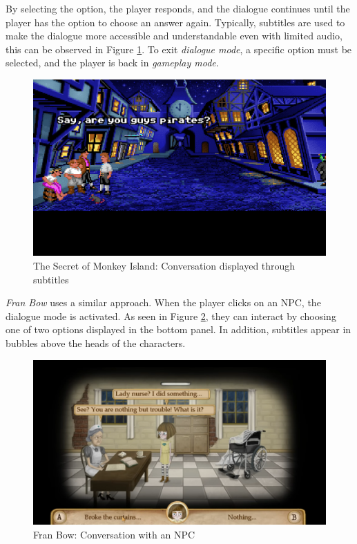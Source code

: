 By selecting the option, the player responds, and the dialogue continues until the player has the option to choose an answer again. Typically, subtitles are used to make the dialogue more accessible and understandable even with limited audio, this can be observed in Figure \ref{fig:D-TSoMI2}. To exit \textit{dialogue mode}, a specific option must be selected, and the player is back in \textit{gameplay mode}.

\begin{figure}[H]
\centering
\includegraphics[width=.8\linewidth]{img/D-TSoMI2.png}
\caption{The Secret of Monkey Island: Conversation displayed through subtitles}
\label{fig:D-TSoMI2}
\end{figure}

\textit{Fran Bow} uses a similar approach. When the player clicks on an NPC, the dialogue mode is activated. As seen in Figure \ref{fig:D-FranBow}, they can interact by choosing one of two options displayed in the bottom panel. In addition, subtitles appear in bubbles above the heads of the characters. 

\begin{figure}[H]
\centering
\includegraphics[width=.8\linewidth]{img/D-FB.png}
\caption{Fran Bow: Conversation with an NPC}
\label{fig:D-FranBow}
\end{figure}

